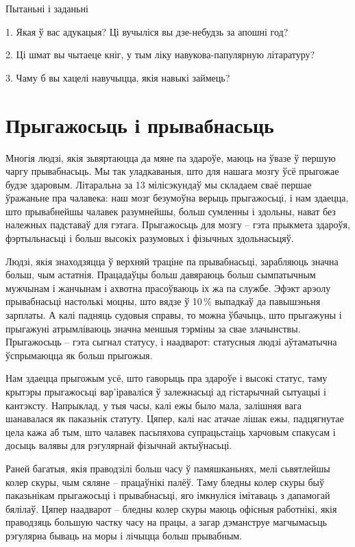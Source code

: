 Пытаньні і заданьні

1. Якая ў вас адукацыя? Ці вучыліся вы дзе-небудзь за апошні год?

2. Ці шмат вы чытаеце кніг, у тым ліку навукова-папулярную літаратуру?

3. Чаму б вы хацелі навучыцца, якія навыкі займець?


\section{Прыгажосьць і прывабнасьць}

Многія людзі, якія зьвяртаюцца да мяне па здароўе, маюць на ўвазе ў першую чаргу прывабнасьць. Мы так уладкаваныя, што для нашага мозгу ўсё прыгожае будзе здаровым. Літаральна за 13 мілісэкундаў мы складаем сваё першае ўражаньне пра чалавека: наш мозг безумоўна верыць прыгажосьці, і нам здаецца, што прывабнейшы чалавек разумнейшы, больш сумленны і здольны, нават без належных падставаў для гэтага. Прыгажосьць для мозгу – гэта прыкмета здароўя, фэртыльнасьці і больш высокіх разумовых і фізычных здольнасьцяў.

Людзі, якія знаходзяцца ў верхняй траціне па прывабнасьці, зарабляюць значна больш, чым астатнія. Працадаўцы больш давяраюць больш сымпатычным мужчынам і жанчынам і ахвотна прасоўваюць іх жа па службе. Эфэкт арэолу прывабнасьці настолькі моцны, што вядзе ў 10\,\% выпадкаў да павышэньня зарплаты. А калі падняць судовыя справы, то можна ўбачыць, што прыгажуны і прыгажуні атрымліваюць значна меншыя тэрміны за свае злачынствы. Прыгажосьць – гэта сыгнал статусу, і наадварот: статусныя людзі аўтаматычна ўспрымаюцца як больш прыгожыя.

Нам здаецца прыгожым усё, што гаворыць пра здароўе і высокі статус, таму крытэры прыгажосьці вар'іраваліся ў залежнасьці ад гістарычнай сытуацыі і кантэксту. Напрыклад, у тыя часы, калі ежы было мала, залішняя вага шанавалася як паказьнік статуту. Цяпер, калі нас атачае лішак ежы, падцягнутае цела кажа аб тым, што чалавек пасьпяхова супрацьстаіць харчовым спакусам і досыць валявы для рэгулярнай фізычнай актыўнасьці.

Раней багатыя, якія праводзілі больш часу ў памяшканьнях, мелі сьвятлейшы колер скуры, чым сяляне – працаўнікі палёў. Таму бледны колер скуры быў паказьнікам прыгажосьці і прывабнасьці, яго імкнуліся імітаваць з дапамогай бялілаў. Цяпер наадварот – бледны колер скуры маюць офісныя работнікі, якія праводзяць большую частку часу на працы, а загар дэманструе магчымасьць рэгулярна бываць на моры і лічыцца больш прывабным.

